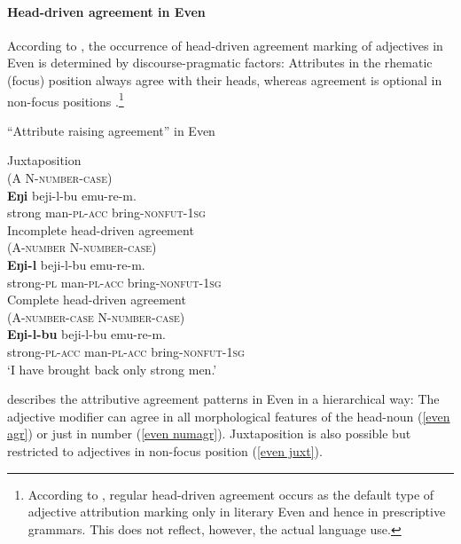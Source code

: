\paragraph*{Head\hyp{}driven agreement in Even}
According to \citet[20]{malchukov1995}, the occurrence of head\hyp{}driven agreement marking of adjectives in Even is determined by discourse-pragmatic factors: Attributes in the rhematic (focus) position always agree with their heads, whereas agreement is optional in non-focus positions \cite[31–32]{malchukov1995}.\footnote{According to \cite[31]{malchukov1995}, regular head\hyp{}driven agreement occurs as the default type of adjective attribution marking only in literary Even and hence in prescriptive grammars. This does not reflect, however, the actual language use.}
\begin{exe}
\ex \label{even raising}
\rm{“Attribute raising agreement” in Even \cite[30–31]{malchukov1995}}
\begin{xlist}
\ex
\label{even juxt}
\rm{Juxtaposition}\\
\rm{(A N-\textsc{number}-\textsc{case})}\\
\gll	\textbf{Eŋi} beji-l-bu emu-re-m.\\
	strong man-\textsc{pl}-\textsc{acc} bring-\textsc{nonfut}-\textsc{1sg}\\

\ex
\label{even numagr}	
\rm{Incomplete head\hyp{}driven agreement}\\
\rm{(A-\textsc{number} N-\textsc{number}-\textsc{case})}\\
\gll	\textbf{Eŋi-l} beji-l-bu emu-re-m.\\
	strong-\textsc{pl} man-\textsc{pl}-\textsc{acc} bring-\textsc{nonfut}-\textsc{1sg}\\

\ex
\label{even agr}	
\rm{Complete head\hyp{}driven agreement}\\
\rm{(A-\textsc{number}-\textsc{case} N-\textsc{number}-\textsc{case})}\\
\gll	\textbf{Eŋi-l-bu} beji-l-bu emu-re-m.\\
	strong-\textsc{pl}-\textsc{acc} man-\textsc{pl}-\textsc{acc} bring-\textsc{nonfut}-\textsc{1sg}\\
\glt	‘I have brought back only strong men.’
\end{xlist}
\end{exe}
\citet[30–31]{malchukov1995} describes the attributive agreement patterns in Even in a hierarchical way: The adjective modifier can agree in all morphological features of the head-noun (\ref{even agr}) or just in number (\ref{even numagr}). Juxtaposition is also possible but restricted to adjectives in non-focus position (\ref{even juxt}).

